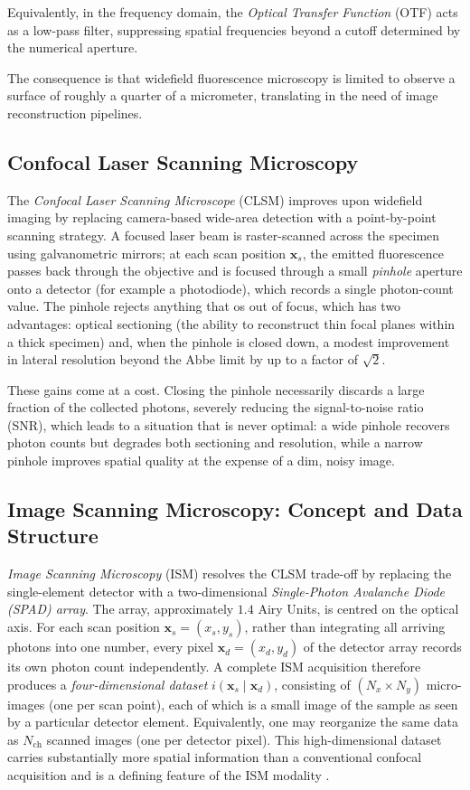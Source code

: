 Equivalently, in the frequency domain, the \textit{Optical Transfer Function} (OTF) acts as a low-pass filter, suppressing spatial frequencies beyond a cutoff determined by the numerical aperture.

The consequence is that widefield fluorescence microscopy is limited to observe a surface of roughly a quarter of a micrometer, translating in the need of image reconstruction pipelines.

\subsection{Confocal Laser Scanning Microscopy}

The \textit{Confocal Laser Scanning Microscope} (CLSM) improves upon widefield imaging by replacing camera-based wide-area detection with a point-by-point scanning strategy. A focused laser beam is raster-scanned across the specimen using galvanometric mirrors; at each scan position $\mathbf{x}_s$, the emitted fluorescence passes back through the objective and is focused through a small \textit{pinhole} aperture onto a detector (for example a photodiode), which records a single photon-count value. The pinhole rejects anything that os out of focus, which has two advantages: optical sectioning (the ability to reconstruct thin focal planes within a thick specimen) and, when the pinhole is closed down, a modest improvement in lateral resolution beyond the Abbe limit by up to a factor of $\sqrt{2}$.

These gains come at a cost. Closing the pinhole necessarily discards a large fraction of the collected photons, severely reducing the signal-to-noise ratio (SNR), which leads to a situation that is never optimal: a wide pinhole recovers photon counts but degrades both sectioning and resolution, while a narrow pinhole improves spatial quality at the expense of a dim, noisy image. 

\subsection{Image Scanning Microscopy: Concept and Data Structure}

\textit{Image Scanning Microscopy} (ISM) resolves the CLSM trade-off by replacing the single-element detector with a two-dimensional \textit{Single-Photon Avalanche Diode (SPAD) array}. The array, approximately $1.4$ Airy Units, is centred on the optical axis. For each scan position $\mathbf{x}_s = (x_s, y_s)$, rather than integrating all arriving photons into one number, every pixel $\mathbf{x}_d = (x_d, y_d)$ of the detector array records its own photon count independently. A complete ISM acquisition therefore produces a \textit{four-dimensional dataset} $i(\mathbf{x}_s \mid \mathbf{x}_d)$, consisting of $(N_x \times N_y)$ micro-images (one per scan point), each of which is a small image of the sample as seen by a particular detector element. Equivalently, one may reorganize the same data as $N_\mathrm{ch}$ scanned images (one per detector pixel). This high-dimensional dataset carries substantially more spatial information than a conventional confocal acquisition and is a defining feature of the ISM modality \cite{zunino_open-source_2023}.

